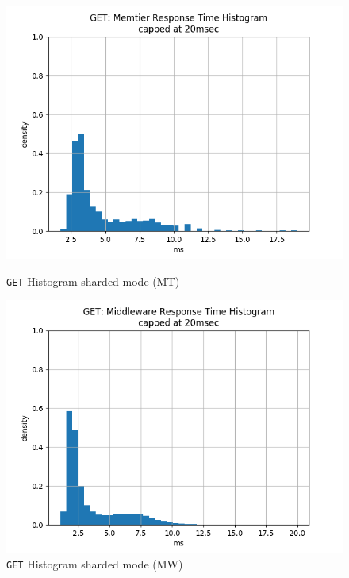\documentclass[11pt,a4paper]{article}
\begin{document}
\begin{figure}[H]
	\centering
	\captionsetup{width=0.4\textwidth}
    \begin{minipage}{0.5\textwidth}
        \centering
        \includegraphics[width=\textwidth]{../illustrations/plots/4_1_full_system_read_sharded/64/memtier_get_hist.png}
        \caption{\texttt{GET} Histogram sharded mode (MT)}
        \label{fig:full_system_sharded_read_mt_hist}
    \end{minipage}\hfill
    \begin{minipage}{0.5\textwidth}
        \centering
        \includegraphics[width=\textwidth]{../illustrations/plots/4_1_full_system_read_sharded/64/middleware_get_hist.png}
        \caption{\texttt{GET} Histogram sharded mode (MW)}
        \label{fig:full_system_sharded_read_mw_hist}
    \end{minipage}
\end{figure}
\end{document}
